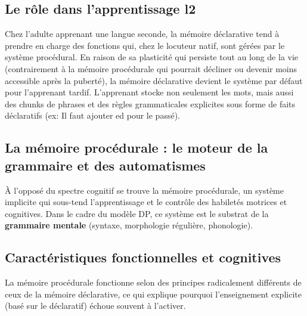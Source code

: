\subsection{Le rôle dans l'apprentissage l2}

Chez l'adulte apprenant une langue seconde, la mémoire déclarative tend à prendre en charge des
fonctions qui, chez le locuteur natif, sont gérées par le système procédural. En raison de sa
plasticité qui persiste tout au long de la vie (contrairement à la mémoire procédurale qui pourrait
décliner ou devenir moins accessible après la puberté), la mémoire déclarative devient le système
\og par défaut\fg{} pour l'apprenant tardif. L'apprenant stocke non seulement les mots, mais aussi
des \og chunks\fg{} de phrases et des règles grammaticales explicites sous forme de faits
déclaratifs (ex: \og Il faut ajouter \-ed pour le passé\fg{}).\cite{II-2-2-ref1}



\subsection{La mémoire procédurale : le moteur de la grammaire et des automatismes}

À l'opposé du spectre cognitif se trouve la mémoire procédurale, un système implicite qui sous-tend
l'apprentissage et le contrôle des habiletés motrices et cognitives. Dans le cadre du modèle DP, ce
système est le substrat de la \textbf{grammaire mentale} (syntaxe, morphologie régulière,
phonologie).



\subsection{Caractéristiques fonctionnelles et cognitives}

La mémoire procédurale fonctionne selon des principes radicalement différents de ceux de la mémoire
déclarative, ce qui explique pourquoi l'enseignement explicite (basé sur le déclaratif) échoue
souvent à l'activer.


